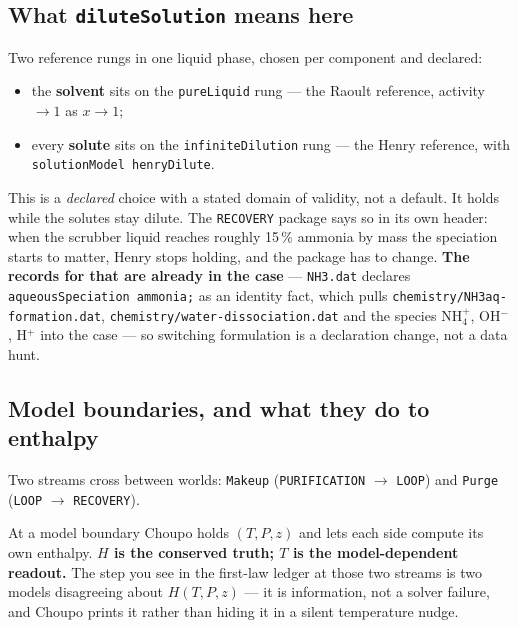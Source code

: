 \documentclass[11pt,a4paper]{article}
\begin{document}
\subsection{What \texttt{diluteSolution} means here}

Two reference rungs in one liquid phase, chosen per component and declared:

\begin{itemize}[leftmargin=*]
\item the \textbf{solvent} sits on the \texttt{pureLiquid} rung --- the Raoult
      reference, activity $\to 1$ as $x \to 1$;
\item every \textbf{solute} sits on the \texttt{infiniteDilution} rung ---
      the Henry reference, with \texttt{solutionModel henryDilute}.
\end{itemize}

This is a \emph{declared} choice with a stated domain of validity, not a
default. It holds while the solutes stay dilute. The \texttt{RECOVERY} package
says so in its own header: when the scrubber liquid reaches roughly 15\,\%
ammonia by mass the speciation starts to matter, Henry stops holding, and the
package has to change. \textbf{The records for that are already in the case}
--- \texttt{NH3.dat} declares \texttt{aqueousSpeciation ammonia;} as an
identity fact, which pulls \texttt{chemistry/NH3aq-formation.dat},
\texttt{chemistry/water-dissociation.dat} and the species NH$_4^+$, OH$^-$,
H$^+$ into the case --- so switching formulation is a declaration change, not a
data hunt.

\subsection{Model boundaries, and what they do to enthalpy}

Two streams cross between worlds: \texttt{Makeup} (\texttt{PURIFICATION}
$\to$ \texttt{LOOP}) and \texttt{Purge} (\texttt{LOOP} $\to$
\texttt{RECOVERY}).

\begin{caveat}
At a model boundary Choupo holds $(T, P, z)$ and lets each side compute its own
enthalpy. \textbf{$H$ is the conserved truth; $T$ is the model-dependent
readout.} The step you see in the first-law ledger at those two streams is two
models disagreeing about $H(T,P,z)$ --- it is information, not a solver
failure, and Choupo prints it rather than hiding it in a silent temperature
nudge.
\end{caveat}
\end{document}
